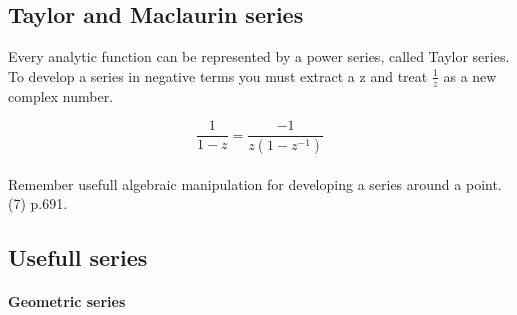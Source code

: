 \subsection{Taylor and Maclaurin series}
Every analytic function can be represented by a power series, called
Taylor series.\\

To develop a series in negative terms you must extract a z and treat
$\frac{1}{z}$ as a new complex number.

\begin{equation}
  \frac{1}{1-z} = \frac{-1}{z(1-z^{-1})}
\end{equation} \\

Remember usefull algebraic manipulation for developing a series around
a point. (7) p.691.

\subsection{Usefull series}

\paragraph{Geometric series}
